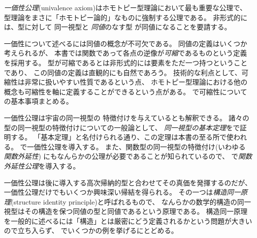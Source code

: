 \documentclass[index]{subfiles}
\begin{document}

\emph{一価性公理}(univalence axiom)はホモトピー型理論において最も重要な公理で、
型理論をまさに「ホモトピー論的」なものに強制する公理である。
非形式的には、型に対して
同一視型と
\emph{同値}のなす型
が同値になることを要請する。

一価性について述べるには同値の概念が不可欠である。
同値の定義はいくつか考えられるが、
本書では関数であって各点の逆像が\emph{可縮}であるものという定義を採用する。
型が可縮であるとは非形式的には要素をただ一つ持つということであり、
この同値の定義は直観的にも自然であろう。
技術的な利点として、可縮性は非常に扱いやすい性質であるという点、
ホモトピー型理論における他の概念も可縮性を軸に定義することができるという点がある。
で可縮性についての基本事項まとめる。

一価性公理は宇宙の同一視型の
特徴付けを与えているとも解釈できる。
諸々の型の同一視型の特徴付けについての一般論として、
\emph{同一視型の基本定理}をで証明する。
「基本定理」と名付けられる通り、この定理は本書の至る所で使われる。
で一価性公理を導入する。
また、関数型の同一視型の特徴付け(いわゆる\emph{関数外延性})
にもなんらかの公理が必要であることが知られているので、
で\emph{関数外延性公理}を導入する。

一価性公理は後に導入する高次帰納的型と合わせてその真価を発揮するのだが、
一価性公理だけでもいくつか興味深い帰結を得られる。
その一つは\emph{構造同一原理}(structure identity principle)と呼ばれるもので、
なんらかの数学的構造の同一視型はその構造を保つ同値の型と同値であるという原理である。
構造同一原理を一般的に述べるには「構造」とは厳密にどう定義されるかという問題が大きいので立ち入らず、
でいくつかの例を挙げるにとどめる。

\begin{mySubsections}
  
  
  
  
  
  
\end{mySubsections}
\end{document}
